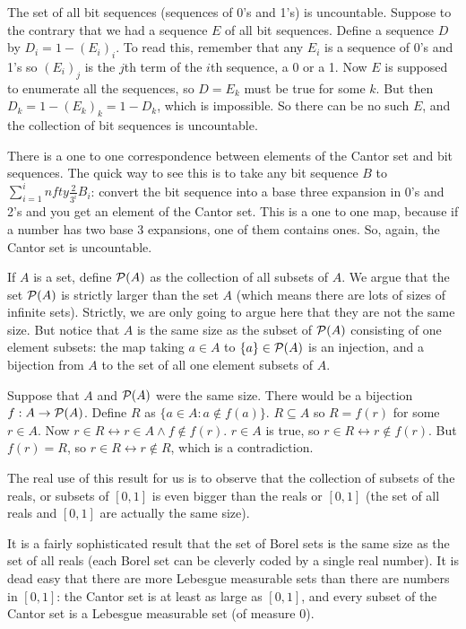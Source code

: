 \documentclass[12pt]{article}
\begin{document}
The set of all bit sequences (sequences of 0's and 1's) is uncountable.  Suppose to the contrary that we had a sequence $E$ of all bit sequences.  Define a sequence $D$ by
$D_i = 1 - (E_i)_i$.  To read this, remember that any $E_i$ is a sequence of 0's and 1's so $(E_i)_j$ is the $j$th term of the $i$th sequence, a 0 or a  1.  Now $E$ is supposed
to enumerate all the sequences, so $D = E_k$ must be true for some $k$.  But then $D_k = 1 - (E_k)_k=1-D_k$, which is impossible.  So there can be no such $E$, and the collection of bit sequences is uncountable.

There is a one to one correspondence between elements of the Cantor set and bit sequences.  The quick way to see this is to take any bit sequence $B$ to $\sum_{i=1}^infty \frac2{3^i}B_i$:  convert the bit sequence into a base three expansion in 0's and 2's and you get an element of the Cantor set.  This is a one to one map, because if a number has two base 3 expansions, one of them contains ones.  So, again, the Cantor set is uncountable.

If $A$ is a set, define ${\cal P}(A)$ as the collection of all subsets of $A$.  We argue that the set ${\cal P}(A)$ is strictly larger than the set $A$ (which means there are lots of sizes of infinite sets).
Strictly, we are only going to argue here that they are not the same size.  But notice that $A$ is the same size as the subset of  ${\cal P}(A)$ consisting of one element subsets:  the map taking $a \in A$ to
$\{a\} \in {\cal P}(A)$ is an injection, and a bijection from $A$ to the set of all one element subsets of $A$.

Suppose that $A$ and ${\cal P}(A)$ were the same size.  There would be a bijection $f:A \rightarrow {\cal P}(A)$.  Define $R$ as $\{a \in A:a \not\in f(a)\}$.  $R \subseteq A$ so $R=f(r)$ for some $r \in A$.  Now $r \in R \leftrightarrow r\in A \wedge f \not\in f(r)$.  $r \in A$ is true, so $r \in R \leftrightarrow r \not\in f(r)$.  But $f(r) = R$, so $r \in R \leftrightarrow r \not\in R$, which is a contradiction.

The real use of this result for us is to observe that the collection of subsets of the reals, or subsets of $[0,1]$ is even bigger than the reals or $[0,1]$ (the set of all reals and $[0,1]$ are actually the same size).

It is a fairly sophisticated result that the set of Borel sets is the same size as the set of all reals (each Borel set can be cleverly coded by a single real number).  It is dead easy that there are more Lebesgue measurable sets than there are numbers in $[0,1]$:  the Cantor set is at least as large as $[0,1]$, and every subset of the Cantor set is a Lebesgue measurable set (of measure 0).
\end{document}
